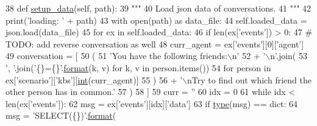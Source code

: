 \begin{DoxyCode}
38     \textcolor{keyword}{def }\hyperlink{namespaceparlai_1_1tasks_1_1multinli_1_1agents_a4fa2cb0ba1ed745336ad8bceed36b841}{setup\_data}(self, path):
39         \textcolor{stringliteral}{"""}
40 \textcolor{stringliteral}{        Load json data of conversations.}
41 \textcolor{stringliteral}{        """}
42         print(\textcolor{stringliteral}{'loading: '} + path)
43         with open(path) \textcolor{keyword}{as} data\_file:
44             self.loaded\_data = json.load(data\_file)
45         \textcolor{keywordflow}{for} ex \textcolor{keywordflow}{in} self.loaded\_data:
46             \textcolor{keywordflow}{if} len(ex[\textcolor{stringliteral}{'events'}]) > 0:
47                 \textcolor{comment}{# TODO: add reverse conversation as well}
48                 curr\_agent = ex[\textcolor{stringliteral}{'events'}][0][\textcolor{stringliteral}{'agent'}]
49                 conversation = [
50                     (
51                         \textcolor{stringliteral}{'You have the following friends:\(\backslash\)n'}
52                         + \textcolor{stringliteral}{'\(\backslash\)n'}.join(
53                             \textcolor{stringliteral}{', '}.join(\textcolor{stringliteral}{'\{\}=\{\}'}.\hyperlink{namespaceparlai_1_1chat__service_1_1services_1_1messenger_1_1shared__utils_a32e2e2022b824fbaf80c747160b52a76}{format}(k, v) \textcolor{keywordflow}{for} k, v \textcolor{keywordflow}{in} person.items())
54                             \textcolor{keywordflow}{for} person \textcolor{keywordflow}{in} ex[\textcolor{stringliteral}{'scenario'}][\textcolor{stringliteral}{'kbs'}][\hyperlink{namespacelanguage__model_1_1eval__ppl_a7d12ee00479673c5c8d1f6d01faa272a}{int}(curr\_agent)]
55                         )
56                         + \textcolor{stringliteral}{'\(\backslash\)nTry to find out which friend the other person has in common.'}
57                     )
58                 ]
59                 curr = \textcolor{stringliteral}{''}
60                 idx = 0
61                 \textcolor{keywordflow}{while} idx < len(ex[\textcolor{stringliteral}{'events'}]):
62                     msg = ex[\textcolor{stringliteral}{'events'}][idx][\textcolor{stringliteral}{'data'}]
63                     \textcolor{keywordflow}{if} \hyperlink{namespaceparlai_1_1agents_1_1tfidf__retriever_1_1build__tfidf_ad5dfae268e23f506da084a9efb72f619}{type}(msg) == dict:
64                         msg = \textcolor{stringliteral}{'SELECT(\{\})'}.\hyperlink{namespaceparlai_1_1chat__service_1_1services_1_1messenger_1_1shared__utils_a32e2e2022b824fbaf80c747160b52a76}{format}(

\end{DoxyCode}
